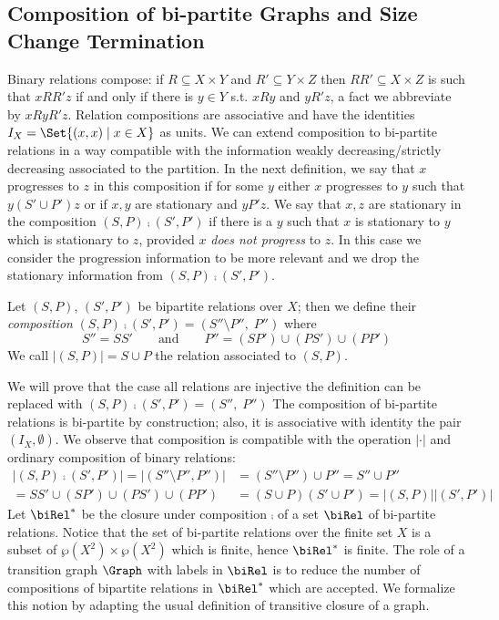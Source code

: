 \subsection{Composition of bi-partite Graphs and Size Change Termination}

Binary relations compose: if $R \subseteq X \times Y$ and 
$R' \subseteq Y \times Z$ then $RR' \subseteq X \times Z$ is such that
$xRR'z$ if and only if there is $y \in Y$ s.t. $xRy$ and $yR'z$, a fact 
we abbreviate by $xRyR'z$. Relation compositions are associative 
and have the identities $I_X = \Set{(x,x) \mid x \in X}$ as units. We can extend composition
to bi-partite relations in a way compatible with the information weakly decreasing/strictly
decreasing associated to the partition. 
In the next definition, we say that $x$ progresses to $z$ in this composition if for some $y$ either $x$ progresses to $y$ such that $y(S' \cup P')z$ or if $x,y$ are stationary and $yP'z$. We say that $x,z$ are stationary in the composition $(S, P) \comp (S', P')$ if there is a $y$ such that $x$ is stationary to $y$ which is stationary to $z$, provided $x$ \emph{does not progress} to $z$. In
this case we consider the progression information to be more relevant and we drop
the stationary information from $(S, P) \comp (S', P')$.

\begin{definition}\label{def:bi-partiteRelations}
Let $(S,P)$, $(S',P')$ be bipartite relations over $X$; then we define their {\em composition} $(S, P) \comp (S', P') = (S'' \setminus P'',\; P'')$
where
\[S'' = S S' \qquad \mbox{and} \qquad P'' = (S P') \cup (P S') \cup (P P') \]
We call $|(S,P)| = S \cup P$ the relation associated to $(S,P)$.
\end{definition}

We will prove that the case all relations are injective the definition
can be replaced with $(S, P) \comp (S', P') = (S'', \; P'')$
The composition of bi-partite relations is bi-partite by construction; also, it is associative
with identity the pair $(I_X, \emptyset)$.
We observe that composition is compatible with the operation 
$|\cdot|$ and ordinary composition of binary relations: 
\begin{align}
\label{eq:unionComp}
|(S,P) \comp (S',P')| = |(S'' \setminus P'', P'')| &= (S''\setminus P'') \cup P''  
= S'' \cup P''  \nonumber \\ = SS' \cup  (S P') \cup (P S') \cup (P P')
& = (S \cup P) (S' \cup P') = |(S,P)| |(S',P')|
\end{align}
Let $\biRel^*$ be the closure under composition $\comp$ of a set $\biRel$ of bi-partite relations. Notice that the set of bi-partite relations over the finite set $X$
is a subset of $\wp(X^2) \times \wp(X^2)$ which is finite, hence $\biRel^*$ is finite.
The role of a transition graph $\Graph$ with labels in $\biRel$ is to reduce the number of
 compositions of bipartite relations in $\biRel^*$ which are accepted. We formalize this notion
by adapting the usual definition of transitive closure of a graph.

